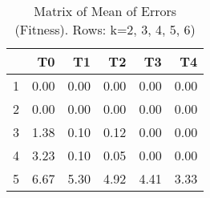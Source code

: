 \begin{table}[ht]
\centering
\begin{tabular}{rrrrrr}
  \hline
 & T0 & T1 & T2 & T3 & T4 \\ 
  \hline
1 & 0.00 & 0.00 & 0.00 & 0.00 & 0.00 \\ 
  2 & 0.00 & 0.00 & 0.00 & 0.00 & 0.00 \\ 
  3 & 1.38 & 0.10 & 0.12 & 0.00 & 0.00 \\ 
  4 & 3.23 & 0.10 & 0.05 & 0.00 & 0.00 \\ 
  5 & 6.67 & 5.30 & 4.92 & 4.41 & 3.33 \\ 
   \hline
\end{tabular}
\caption{Matrix of Mean of Errors (Fitness).  Rows: k=2, 3, 4, 5, 6)} 
\end{table}
